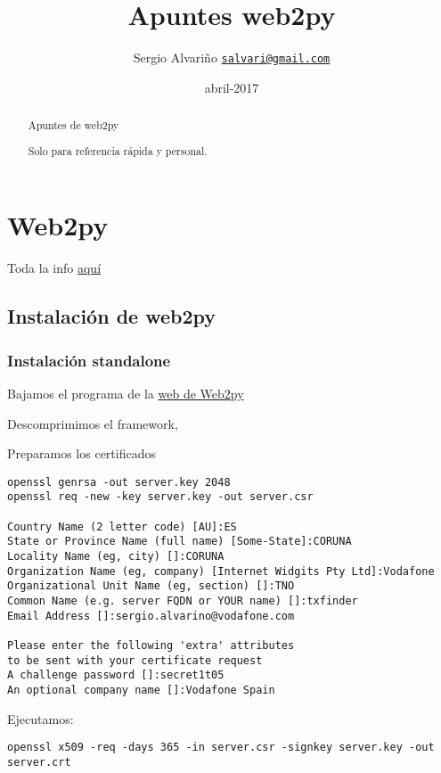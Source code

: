 \documentclass[12pt,spanish,]{article}
\title{Apuntes web2py}
\author{Sergio Alvariño
\href{mailto:salvari@gmail.com}{\nolinkurl{salvari@gmail.com}}}
\date{abril-2017}
\begin{document}
\maketitle
\begin{abstract}
Apuntes de web2py

Solo para referencia rápida y personal.
\end{abstract}

{
\hypersetup{linkcolor=black}
\setcounter{tocdepth}{3}
\tableofcontents
}
\section{Web2py}\label{web2py}

Toda la info \href{http://web2py.com}{aquí}

\subsection{Instalación de web2py}\label{instalaciuxf3n-de-web2py}

\subsubsection{Instalación standalone}\label{instalaciuxf3n-standalone}

Bajamos el programa de la
\href{http://www.web2py.com/init/default/download}{web de Web2py}

Descomprimimos el framework,

Preparamos los certificados

\begin{verbatim}
openssl genrsa -out server.key 2048
openssl req -new -key server.key -out server.csr

Country Name (2 letter code) [AU]:ES
State or Province Name (full name) [Some-State]:CORUNA
Locality Name (eg, city) []:CORUNA
Organization Name (eg, company) [Internet Widgits Pty Ltd]:Vodafone
Organizational Unit Name (eg, section) []:TNO
Common Name (e.g. server FQDN or YOUR name) []:txfinder
Email Address []:sergio.alvarino@vodafone.com

Please enter the following 'extra' attributes
to be sent with your certificate request
A challenge password []:secret1t05
An optional company name []:Vodafone Spain
\end{verbatim}

Ejecutamos:

\begin{verbatim}
openssl x509 -req -days 365 -in server.csr -signkey server.key -out server.crt
\end{verbatim}
\end{document}
